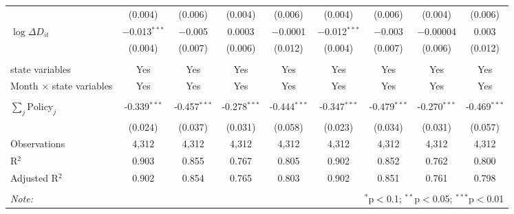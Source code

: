 \begin{tabular}{@{\extracolsep{1pt}}lcccccccc}
  & (0.004) & (0.006) & (0.004) & (0.006) & (0.004) & (0.006) & (0.004) & (0.006) \\ 
  $\log \Delta D_{it}$ & $-$0.013$^{***}$ & $-$0.005 & 0.0003 & $-$0.0001 & $-$0.012$^{***}$ & $-$0.003 & $-$0.00004 & 0.003 \\ 
  & (0.004) & (0.007) & (0.006) & (0.012) & (0.004) & (0.007) & (0.006) & (0.012) \\ 
 \hline \\[-1.8ex] 
state variables & Yes & Yes & Yes & Yes & Yes & Yes & Yes & Yes \\ 
Month $\times$ state variables & Yes & Yes & Yes & Yes & Yes & Yes & Yes & Yes \\ 
\hline \\[-1.8ex] 
$\sum_j \mathrm{Policy}_j$ & -0.339$^{***}$ & -0.457$^{***}$ & -0.278$^{***}$ & -0.444$^{***}$ & -0.347$^{***}$ & -0.479$^{***}$ & -0.270$^{***}$ & -0.469$^{***}$ \\ 
 & (0.024) & (0.037) & (0.031) & (0.058) & (0.023) & (0.034) & (0.031) & (0.057) \\ 
Observations & 4,312 & 4,312 & 4,312 & 4,312 & 4,312 & 4,312 & 4,312 & 4,312 \\ 
R$^{2}$ & 0.903 & 0.855 & 0.767 & 0.805 & 0.902 & 0.852 & 0.762 & 0.800 \\ 
Adjusted R$^{2}$ & 0.902 & 0.854 & 0.765 & 0.803 & 0.902 & 0.851 & 0.761 & 0.798 \\ 
\hline 
\hline \\[-1.8ex] 
\textit{Note:}  & \multicolumn{8}{r}{$^{*}$p$<$0.1; $^{**}$p$<$0.05; $^{***}$p$<$0.01} \\ 
\end{tabular} 